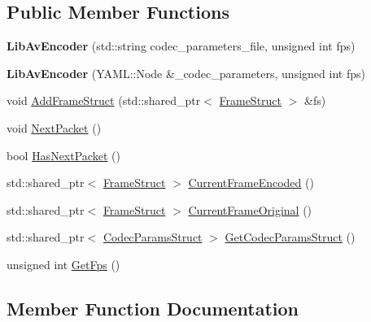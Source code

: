 \subsection*{Public Member Functions}
\begin{DoxyCompactItemize}
\item 
\mbox{\label{classmoetsi_1_1ssp_1_1LibAvEncoder_a92b5b4c1f7da0a5cbf30bbf4fe7c89d4}} 
{\bfseries Lib\+Av\+Encoder} (std\+::string codec\+\_\+parameters\+\_\+file, unsigned int fps)
\item 
\mbox{\label{classmoetsi_1_1ssp_1_1LibAvEncoder_a2d5ec3b4a92f7b9378fd397624bd4ea4}} 
{\bfseries Lib\+Av\+Encoder} (Y\+A\+M\+L\+::\+Node \&\+\_\+codec\+\_\+parameters, unsigned int fps)
\item 
void \hyperlink{classmoetsi_1_1ssp_1_1LibAvEncoder_acd321dd52800b23b383b2e9489118009}{Add\+Frame\+Struct} (std\+::shared\+\_\+ptr$<$ \hyperlink{structmoetsi_1_1ssp_1_1FrameStruct}{Frame\+Struct} $>$ \&fs)
\item 
void \hyperlink{classmoetsi_1_1ssp_1_1LibAvEncoder_acf5e6e2f172d24778c7942c8cd37330b}{Next\+Packet} ()
\item 
bool \hyperlink{classmoetsi_1_1ssp_1_1LibAvEncoder_a306c0935fa37bd35ddfeb8290289e927}{Has\+Next\+Packet} ()
\item 
std\+::shared\+\_\+ptr$<$ \hyperlink{structmoetsi_1_1ssp_1_1FrameStruct}{Frame\+Struct} $>$ \hyperlink{classmoetsi_1_1ssp_1_1LibAvEncoder_aedb37703d73b55f1389a122d2ecbe923}{Current\+Frame\+Encoded} ()
\item 
std\+::shared\+\_\+ptr$<$ \hyperlink{structmoetsi_1_1ssp_1_1FrameStruct}{Frame\+Struct} $>$ \hyperlink{classmoetsi_1_1ssp_1_1LibAvEncoder_a249c65ad557f438d6856e875f01a1947}{Current\+Frame\+Original} ()
\item 
std\+::shared\+\_\+ptr$<$ \hyperlink{structmoetsi_1_1ssp_1_1CodecParamsStruct}{Codec\+Params\+Struct} $>$ \hyperlink{classmoetsi_1_1ssp_1_1LibAvEncoder_a2ff6afafbb5da48e900d34d70a46d00c}{Get\+Codec\+Params\+Struct} ()
\item 
unsigned int \hyperlink{classmoetsi_1_1ssp_1_1LibAvEncoder_ae21f81cb967359132183a29e04307933}{Get\+Fps} ()
\end{DoxyCompactItemize}


\subsection{Member Function Documentation}
\mbox{\label{classmoetsi_1_1ssp_1_1LibAvEncoder_acd321dd52800b23b383b2e9489118009}} 
